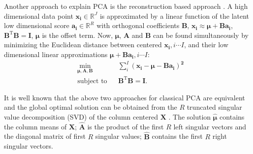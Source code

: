 Another approach to explain PCA is the reconstruction based approach \cite{zou2006sparse}. A high dimensional data point $\mathbf{x_i} \in \mathbb{R}^J$ is approximated by a linear function of the latent low dimensional score $\mathbf{a_i} \in \mathbb{R}^R$ with orthogonal coefficients $\mathbf{B}$, $\mathbf{x_i} \approx \bm{\mu} + \mathbf{Ba_i}$, $\mathbf{B}^{\text{T}}\mathbf{B} = \mathbf{I}$, $\bm{\mu}$ is the offset term. Now, $\bm{\mu}$, $\mathbf{A}$ and $\mathbf{B}$ can be found simultaneously by minimizing the Euclidean distance between centered $\mathbf{x_i}, i\cdots I$, and their low dimensional linear approximations $\bm{\mu} + \mathbf{Ba_i}, i \cdots I$:
\begin{equation}\label{chapter2_eq:2}
\begin{aligned}
&\underset{\bm{\mu},\mathbf{A}, \mathbf{B}}{\text{min}}
&&\sum_{i}^{I}{\mathbf{( x_i-\bm{\mu} -Ba_i)^{2}}}\\
&\text{subject to}
&&\mathbf{B}^{\text{T}}\mathbf{B} = \mathbf{I}.
\end{aligned}
\end{equation}

It is well known that the above two approaches for classical PCA are equivalent and the global optimal solution can be obtained from the $R$ truncated singular value decomposition (SVD) of the column centered $\mathbf{X}$ \cite{ten1993least}. The solution $\hat{\bm{\mu}}$ contains the column means of $\mathbf{X}$; $\hat{\mathbf{A}}$ is the product of the first $R$ left singular vectors and the diagonal matrix of first $R$ singular values; $\hat{\mathbf{B}}$ contains the first $R$ right singular vectors.

